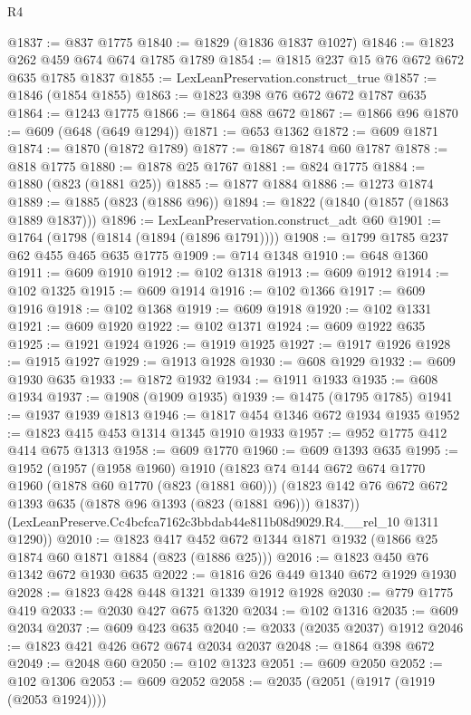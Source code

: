 \begin{lexlean}{R4}
\begin{coremodule}
@1837 := @837 @1775
@1840 := @1829 (@1836 @1837 @1027)
@1846 := @1823 @262 @459 @674 @674 @1785 @1789
@1854 := @1815 @237 @15 @76 @672 @672 @635 @1785 @1837
@1855 := LexLeanPreservation.construct_true
@1857 := @1846 (@1854 @1855)
@1863 := @1823 @398 @76 @672 @672 @1787 @635
@1864 := @1243 @1775
@1866 := @1864 @88 @672
@1867 := @1866 @96
@1870 := @609 (@648 (@649 @1294))
@1871 := @653 @1362
@1872 := @609 @1871
@1874 := @1870 (@1872 @1789)
@1877 := @1867 @1874 @60 @1787
@1878 := @818 @1775
@1880 := @1878 @25 @1767
@1881 := @824 @1775
@1884 := @1880 (@823 (@1881 @25))
@1885 := @1877 @1884
@1886 := @1273 @1874
@1889 := @1885 (@823 (@1886 @96))
@1894 := @1822 (@1840 (@1857 (@1863 @1889 @1837)))
@1896 := LexLeanPreservation.construct_adt @60
@1901 := @1764 (@1798 (@1814 (@1894 (@1896 @1791))))
@1908 := @1799 @1785 @237 @62 @455 @465 @635 @1775
@1909 := @714 @1348
@1910 := @648 @1360
@1911 := @609 @1910
@1912 := @102 @1318
@1913 := @609 @1912
@1914 := @102 @1325
@1915 := @609 @1914
@1916 := @102 @1366
@1917 := @609 @1916
@1918 := @102 @1368
@1919 := @609 @1918
@1920 := @102 @1331
@1921 := @609 @1920
@1922 := @102 @1371
@1924 := @609 @1922 @635
@1925 := @1921 @1924
@1926 := @1919 @1925
@1927 := @1917 @1926
@1928 := @1915 @1927
@1929 := @1913 @1928
@1930 := @608 @1929
@1932 := @609 @1930 @635
@1933 := @1872 @1932
@1934 := @1911 @1933
@1935 := @608 @1934
@1937 := @1908 (@1909 @1935)
@1939 := @1475 (@1795 @1785)
@1941 := @1937 @1939 @1813
@1946 := @1817 @454 @1346 @672 @1934 @1935
@1952 := @1823 @415 @453 @1314 @1345 @1910 @1933
@1957 := @952 @1775 @412 @414 @675 @1313
@1958 := @609 @1770
@1960 := @609 @1393 @635
@1995 := @1952
    (@1957
      (@1958 @1960)
      @1910
      (@1823
        @74
        @144
        @672
        @674
        @1770
        @1960
        (@1878 @60 @1770 (@823 (@1881 @60)))
        (@1823 @142 @76 @672 @672 @1393 @635 (@1878 @96 @1393 (@823 (@1881 @96))) @1837))
      (LexLeanPreserve.Cc4bcfca7162c3bbdab44e811b08d9029.R4.__rel_10 @1311 @1290))
@2010 := @1823 @417 @452 @672 @1344 @1871 @1932 (@1866 @25 @1874 @60 @1871 @1884 (@823 (@1886 @25)))
@2016 := @1823 @450 @76 @1342 @672 @1930 @635
@2022 := @1816 @26 @449 @1340 @672 @1929 @1930
@2028 := @1823 @428 @448 @1321 @1339 @1912 @1928
@2030 := @779 @1775 @419
@2033 := @2030 @427 @675 @1320
@2034 := @102 @1316
@2035 := @609 @2034
@2037 := @609 @423 @635
@2040 := @2033 (@2035 @2037) @1912
@2046 := @1823 @421 @426 @672 @674 @2034 @2037
@2048 := @1864 @398 @672
@2049 := @2048 @60
@2050 := @102 @1323
@2051 := @609 @2050
@2052 := @102 @1306
@2053 := @609 @2052
@2058 := @2035 (@2051 (@1917 (@1919 (@2053 @1924))))

\end{coremodule}
\end{lexlean}
